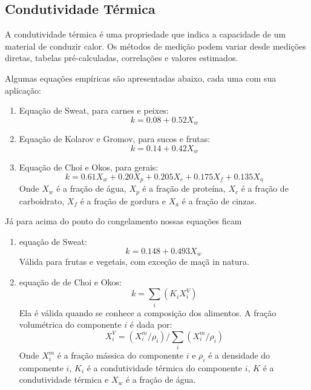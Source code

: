 \subsection{Condutividade Térmica}
A condutividade térmica é uma propriedade que indica a capacidade de um material de conduzir calor.
Os métodos de medição podem variar desde medições diretas, tabelas pré-calculadas, correlações e
valores estimados. \par

Algumas equações empíricas são apresentadas abaixo, cada uma com sua aplicação:
\begin{enumerate}
    \item {Equação de Sweat, para carnes e peixes:
        \begin{equation}\label{eq:sweat}
            k  = 0.08 + 0.52 X_{w}
        \end{equation}}
    \item {Equação de Kolarov e Gromov, para sucos e frutas:
        \begin{equation}\label{eq:kolarov}
            k  = 0.14 + 0.42 X_{w}
        \end{equation}}
    \item {Equação de Choi e Okos, para gerais:
        \begin{equation}\label{eq:choi}
            k  = 0.61 X_{w} + 0.20 X_{p} + 0.205 X_{c} + 0.175X_{f} + 0.135X_{a} 
        \end{equation}
        Onde $X_{w}$ é a fração de água, $X_{p}$ é a fração de proteína, $X_{c}$ é a fração de
        carboidrato, $X_{f}$ é a fração de gordura e $X_{a}$ é a fração de cinzas.}
\end{enumerate}
Já para acima do ponto do congelamento nossas equações ficam
\begin{enumerate}
    \item {equação de Sweat:
        \begin{equation}\label{eq:sweat2}
            k  = 0.148 + 0.493X_{w} \
        \end{equation}
        Válida para frutas e vegetais, com exceção de maçã in natura.}
        \item {equação de de Choi e Okos:
            \begin{equation}\label{eq:choi2}
                k = \sum_{i} \left( K_{i}  X_i^{V}  \right)
            \end{equation}
            Ela é válida quando se conhece a composição dos alimentos. A fração volumétrica do
            componente \(i\) é dada por:
            \begin{equation}\label{eq:fracao_volumetrica}
                X_i^{V} = (X_i^{m}/\rho_i) / \sum_{i} (X_i^{m}/\rho_i)
            \end{equation}
            Onde \(X_i^{m}\) é a fração mássica do componente \(i\) e \(\rho_i\) é a densidade do
            componente \(i\), \(K_{i} \) é a condutividade térmica do componente \(i\), \(K\) é a
            condutividade térmica e \(X_{w} \) é  a fração de água.}
\end{enumerate}
